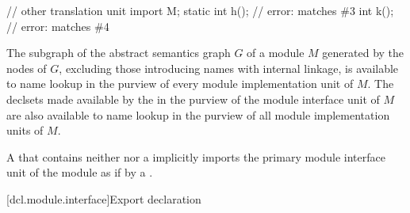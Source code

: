 \begin{std.txt}
\begin{example}
\begin{after}
\begin{codeblock}
      // other translation unit
      import M;
      static int h();     // error: matches \#3
      int k();            // error: matches \#4
    \end{codeblock}
    \end{after}
  \end{example}

  \alinea
\begin{before}\color{addclr}
  The subgraph of the abstract semantics graph $G$ of a module $M$
  generated by the nodes of $G$, excluding those introducing names
  with internal linkage, is available to name lookup in the purview of every
  module implementation unit of $M$.
  The declsets made available by the 
   in the purview of
   the module interface unit of $M$
   are also available to name lookup in the purview of all 
  module implementation units of $M$.
\end{before}
\begin{after}\color{addclr}
A 
that contains neither 
nor a 
implicitly imports the primary module interface unit of the module
as if by a .
\end{after}
\end{std.txt}

[dcl.module.interface]{Export declaration}%

